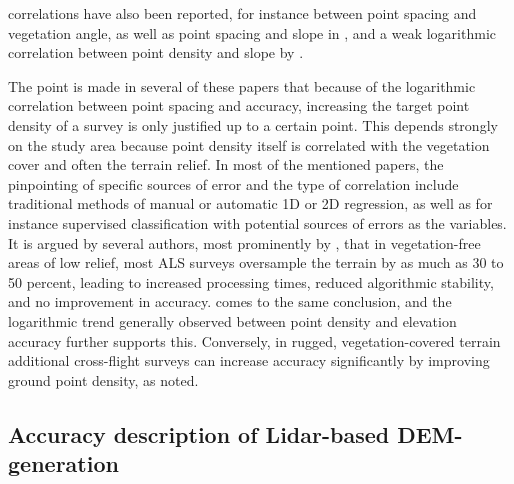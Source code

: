 correlations have also been reported, for instance between point spacing and vegetation angle, as well as point spacing and slope in \cite{peng_shih_2006}, and a weak logarithmic correlation between point density and slope by \cite{chow_hodgson_2009}.

The point is made in several of these papers that because of the logarithmic correlation between point spacing and accuracy, increasing the target point density of a survey is only justified up to a certain point. This depends strongly on the study area because point density itself is correlated with the vegetation cover and often the terrain relief. In most of the mentioned papers, the pinpointing of specific sources of error and the type of correlation include traditional methods of manual or automatic 1D or 2D regression, as well as for instance supervised classification with potential sources of errors as the variables. It is argued by several authors, most prominently by \cite{guo_etal_2010}, that in vegetation-free areas of low relief, most ALS surveys oversample the terrain by as much as 30 to 50 percent, leading to increased processing times, reduced algorithmic stability, and no improvement in accuracy. \cite{bater_coops_2009} comes to the same conclusion, and the logarithmic trend generally observed between point density and elevation accuracy further supports this. Conversely, in rugged, vegetation-covered terrain additional cross-flight surveys can increase accuracy significantly by improving ground point density, as \cite{peng_shih_2006} noted.

\subsection*{Accuracy description of Lidar-based DEM-generation}
\label{subsection:lidardemaccuracy}

